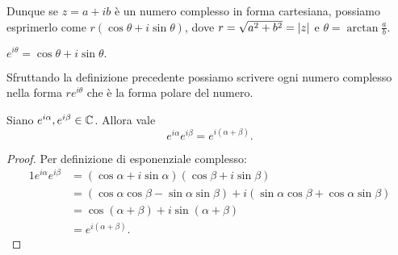 Dunque se $z = a+ib$ è un numero complesso in forma cartesiana, possiamo esprimerlo come $r(\cos\theta + i\sin\theta)$, dove $r = \sqrt{a^2 + b^2} = \left|z\right|$ e $\theta = \arctan \frac{a}{b}$.

\begin{definition}
    $e^{i\theta} = \cos\theta + i\sin\theta.$
\end{definition}

Sfruttando la definizione precedente possiamo scrivere ogni numero complesso nella forma $re^{i\theta}$ che è la forma polare del numero.

\begin{proposition}
    Siano $e^{i\alpha}, e^{i\beta} \in \mathbb{C}$. Allora vale \[
        e^{i\alpha} e^{i\beta} = e^{i(\alpha + \beta)}.
    \]
\end{proposition}
\begin{proof}
    Per definizione di esponenziale complesso:
    \begin{alignat*}{1}
        e^{i\alpha} e^{i\beta} &= (\cos\alpha + i\sin\alpha)(\cos\beta + i\sin\beta)\\
        &= (\cos\alpha \cos\beta - \sin\alpha \sin\beta) + i(\sin\alpha \cos\beta + \cos\alpha \sin\beta)\\
        &= \cos(\alpha + \beta) + i\sin(\alpha + \beta)\\
        &= e^{i(\alpha + \beta)}. \tag*{\qedhere}
    \end{alignat*}
\end{proof}